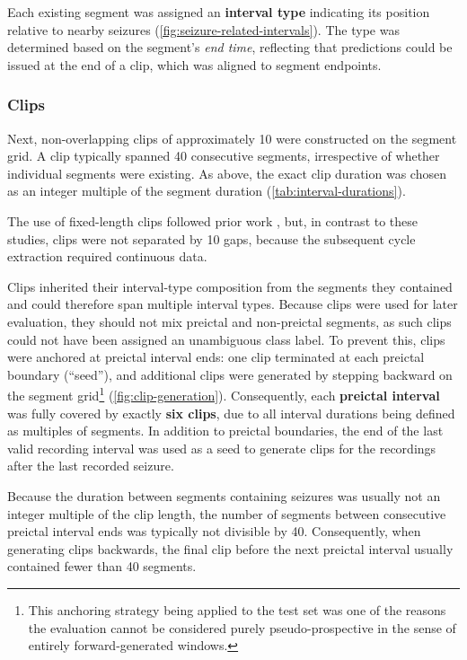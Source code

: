 Each existing segment was assigned an \textbf{interval type} indicating its position relative to nearby seizures (\cref{fig:seizure-related-intervals}).
The type was determined based on the segment's \textit{end time}, reflecting that predictions could be issued at the end of a clip, which was aligned to segment endpoints.

\subsubsection{Clips}
Next, non-overlapping clips of approximately \SI{10}{\min} were constructed on the segment grid.
A clip typically spanned 40 consecutive segments, irrespective of whether individual segments were existing.
As above, the exact clip duration was chosen as an integer multiple of the segment duration (\cref{tab:interval-durations}).

The use of fixed-length clips followed prior work \parencite{brinkmann_crowdsourcing_2016, kuhlmann_epilepsyecosystemorg_2018, muller_coherent_2022}, but, in contrast to these studies, clips were not separated by \SI{10}{\sec} gaps, because the subsequent cycle extraction required continuous data.

Clips inherited their interval-type composition from the segments they contained and could therefore span multiple interval types.
Because clips were used for later evaluation, they should not mix preictal and non-preictal segments, as such clips could not have been assigned an unambiguous class label.
To prevent this, clips were anchored at preictal interval ends: one clip terminated at each preictal boundary (\enquote{seed}), and additional clips were generated by stepping backward on the segment grid\footnote{This anchoring strategy being applied to the test set was one of the reasons the evaluation cannot be considered purely pseudo-prospective in the sense of entirely forward-generated windows.} (\cref{fig:clip-generation}).
Consequently, each \textbf{preictal interval} was fully covered by exactly \textbf{six clips}, due to all interval durations being defined as multiples of segments.
In addition to preictal boundaries, the end of the last valid recording interval was used as a seed to generate clips for the recordings after the last recorded seizure.

Because the duration between segments containing seizures was usually not an integer multiple of the clip length, the number of segments between consecutive preictal interval ends was typically not divisible by 40.
Consequently, when generating clips backwards, the final clip before the next preictal interval usually contained fewer than 40 segments.

